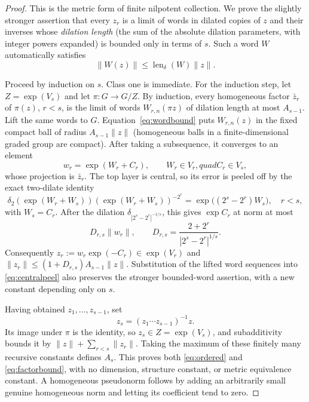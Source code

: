 \documentclass[10pt]{article}
\newcommand{\norm}[1]{\lVert #1\rVert}
\begin{document}
\begin{proof}
This is the metric form of finite nilpotent collection.  We prove the slightly
stronger assertion that every $z_r$ is a limit of words in dilated copies of
$z$ and their inverses whose \emph{dilation length} (the sum of the absolute
dilation parameters, with integer powers expanded) is bounded only in terms
of $s$.  Such a word $W$ automatically satisfies
\begin{equation}\label{eq:wordbound}
                         \norm{W(z)}
                         \leq \operatorname{len}_\delta(W)\norm z.
\end{equation}

Proceed by induction on $s$.  Class one is immediate.  For the induction
step, let $Z=\exp(V_s)$ and let $\pi:G\to G/Z$.  By induction, every
homogeneous factor $\bar z_r$ of $\pi(z)$, $r<s$, is the limit of words
$W_{r,n}(\pi z)$ of dilation length at most $A_{s-1}$.  Lift the same words to
$G$.  Equation~\eqref{eq:wordbound} puts $W_{r,n}(z)$ in the fixed compact
ball of radius $A_{s-1}\norm z$ (homogeneous balls in a finite-dimensional
graded group are compact).  After taking a subsequence, it converges to an
element
\[
                         w_r=\exp(W_r+C_r),
                         \qquad W_r\in V_r,quad C_r\in V_s,
\]
whose projection is $\bar z_r$.  The top layer is central, so its error is
peeled off by the exact two-dilate identity
\begin{equation}\label{eq:centralpeel}
 \delta_2\!\left(\exp(W_r+W_s)\right)
 \left(\exp(W_r+W_s)\right)^{-2^r}
 =\exp\big((2^s-2^r)W_s\big),
 \quad r<s,
\end{equation}
with $W_s=C_r$.  After the dilation
$\delta_{|2^s-2^r|^{-1/s}}$, this gives $\exp C_r$ at norm at most
\[
 D_{r,s}\norm{w_r},\qquad
 D_{r,s}=\frac{2+2^r}{|2^s-2^r|^{1/s}}.
\]
Consequently $z_r:=w_r\exp(-C_r)\in\exp(V_r)$ and
$\norm{z_r}\leq(1+D_{r,s})A_{s-1}\norm z$.  Substitution of the lifted word
sequences into \eqref{eq:centralpeel} also preserves the stronger bounded-word
assertion, with a new constant depending only on $s$.

Having obtained $z_1,\ldots,z_{s-1}$, set
\[
                         z_s=(z_1\cdots z_{s-1})^{-1}z.
\]
Its image under $\pi$ is the identity, so $z_s\in Z=\exp(V_s)$, and
subadditivity bounds it by
$\norm z+\sum_{r<s}\norm{z_r}$.  Taking the maximum of these finitely many
recursive constants defines $A_s$.  This proves both \eqref{eq:ordered} and
\eqref{eq:factorbound}, with no dimension, structure constant, or metric
equivalence constant.  A homogeneous pseudonorm follows by adding an
arbitrarily small genuine homogeneous norm and letting its coefficient tend
to zero.
\end{proof}
\end{document}
